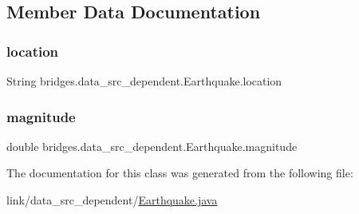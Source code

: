 \subsection{Member Data Documentation}
\hypertarget{classbridges_1_1data__src__dependent_1_1_earthquake_a5bcddcb4e356ff31ce13e45500833af2}{}\label{classbridges_1_1data__src__dependent_1_1_earthquake_a5bcddcb4e356ff31ce13e45500833af2} 
\subsubsection{\texorpdfstring{location}{location}}
{\footnotesize\ttfamily String bridges.\+data\+\_\+src\+\_\+dependent.\+Earthquake.\+location}

\hypertarget{classbridges_1_1data__src__dependent_1_1_earthquake_a11ef9e78dedf05d44fc72fcf2b097d83}{}\label{classbridges_1_1data__src__dependent_1_1_earthquake_a11ef9e78dedf05d44fc72fcf2b097d83} 
\subsubsection{\texorpdfstring{magnitude}{magnitude}}
{\footnotesize\ttfamily double bridges.\+data\+\_\+src\+\_\+dependent.\+Earthquake.\+magnitude}



The documentation for this class was generated from the following file\+:\begin{DoxyCompactItemize}
\item 
link/data\+\_\+src\+\_\+dependent/\hyperlink{_earthquake_8java}{Earthquake.\+java}\end{DoxyCompactItemize}
